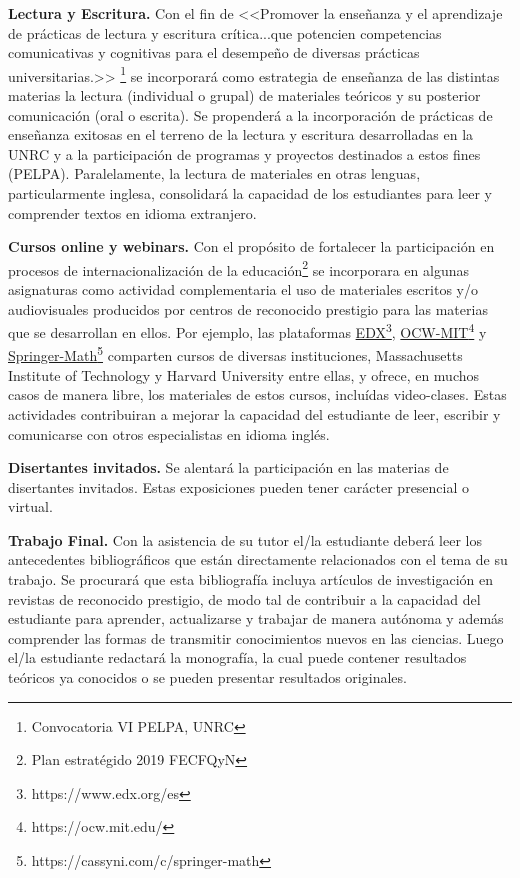 \documentclass[a4paper, 12pt]{article}
\begin{document}
\begin{description}
 




\item{\textbf{Lectura y Escritura.}} Con el fin de <<Promover la enseñanza y el aprendizaje de prácticas de lectura y escritura crítica...que potencien competencias comunicativas y cognitivas para el desempeño de diversas prácticas universitarias.>> \footnote{Convocatoria VI PELPA, UNRC}  se incorporará  como estrategia de enseñanza de las distintas  materias la lectura (individual o grupal) de materiales teóricos y su posterior comunicación (oral o escrita). Se propenderá a la incorporación  de prácticas de enseñanza exitosas en el terreno de la lectura y escritura desarrolladas en la UNRC \cite{roldan2022} y a la participación de programas y proyectos destinados a estos fines (PELPA).  Paralelamente, la lectura de materiales en otras lenguas, particularmente inglesa, consolidará la capacidad de los estudiantes para leer y comprender textos en idioma extranjero.  


\item{\textbf{Cursos online y webinars.}} Con el propósito de fortalecer  la participación en procesos de internacionalización de la educación\footnote{Plan estratégido 2019 FECFQyN}  se  incorporara en algunas asignaturas como actividad complementaria el uso de materiales escritos y/o audiovisuales producidos por centros de reconocido prestigio para las materias que se desarrollan en ellos. Por ejemplo, las plataformas \href{https://www.edx.org/es}{EDX}\footnote{https://www.edx.org/es}, \href{https://ocw.mit.edu/}{OCW-MIT}\footnote{https://ocw.mit.edu/} y  \href{https://cassyni.com/c/springer-math}{Springer-Math}\footnote{https://cassyni.com/c/springer-math} comparten cursos de diversas instituciones, Massachusetts Institute of Technology y Harvard University entre ellas, y ofrece, en muchos casos de manera libre, los materiales de estos cursos, incluídas video-clases. Estas actividades contribuiran a mejorar la capacidad del estudiante de leer, escribir y comunicarse con
otros especialistas en idioma inglés. 


\item{\textbf{Disertantes invitados.}} Se alentará la participación en las materias de disertantes invitados. Estas exposiciones pueden tener carácter presencial o virtual.   

\item{\textbf{Trabajo Final.}}   Con la asistencia de su tutor el/la estudiante deberá leer los antecedentes bibliográficos que están directamente relacionados con el tema de su trabajo. Se procurará que esta bibliografía incluya artículos de investigación en revistas de reconocido prestigio, de modo tal de contribuir a la capacidad del estudiante para aprender, actualizarse y trabajar de manera autónoma y además  comprender las formas de transmitir conocimientos nuevos en las ciencias. Luego el/la estudiante  redactará la monografía, la cual puede contener resultados teóricos ya conocidos o se pueden presentar resultados originales.



\end{description}
\end{document}
